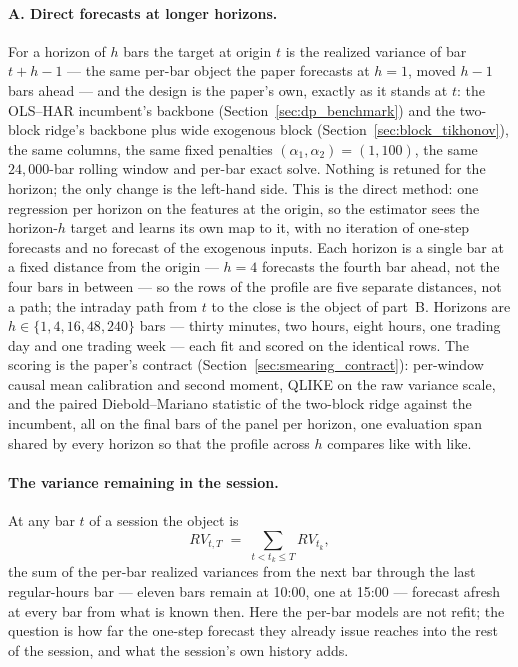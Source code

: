 \paragraph{A. Direct forecasts at longer horizons.} For a horizon of
$h$ bars the target at origin $t$ is the realized variance of bar
$t+h-1$ --- the same per-bar object the paper forecasts at $h = 1$,
moved $h-1$ bars ahead --- and the design is the paper's own, exactly
as it stands at $t$: the OLS--HAR incumbent's backbone
(Section~\ref{sec:dp_benchmark}) and the two-block ridge's backbone plus
wide exogenous block (Section~\ref{sec:block_tikhonov}), the same
columns, the same fixed penalties $(\alpha_1, \alpha_2) = (1, 100)$,
the same $24{,}000$-bar rolling window and per-bar exact solve. Nothing
is retuned for the horizon; the only change is the left-hand side.
This is the direct method: one regression per horizon on the features
at the origin, so the estimator sees the horizon-$h$ target and learns
its own map to it, with no iteration of one-step forecasts and no
forecast of the exogenous inputs. Each horizon is a single bar at a
fixed distance from the origin --- $h = 4$ forecasts the fourth bar
ahead, not the four bars in between --- so the rows of the profile are
five separate distances, not a path; the intraday path from $t$ to the
close is the object of part~B. Horizons are $h \in \{1, 4, 16, 48,
240\}$ bars --- thirty minutes, two hours, eight hours, one trading day
and one trading week --- each fit and scored on the identical rows. The
scoring is the paper's contract (Section~\ref{sec:smearing_contract}):
per-window causal mean calibration and second moment, QLIKE on the raw
variance scale, and the paired Diebold--Mariano statistic of the
two-block ridge against the incumbent, all on the final \mhpNBars{}
bars of the panel per horizon, one evaluation span shared by every
horizon so that the profile across $h$ compares like with like.

\fi

\paragraph{The variance remaining in the session.} At any bar $t$ of
a session the object is
\begin{equation}
    RV_{t,T} \;=\; \sum_{t < t_k \le T} RV_{t_k},
    \label{eq:mh_target}
\end{equation}
the sum of the per-bar realized variances from the next bar through the
last regular-hours bar --- eleven bars remain at 10:00, one at 15:00
--- forecast afresh at every bar from what is known then. Here the
per-bar models are not refit; the question is how far the one-step
forecast they already issue reaches into the rest of the session, and
what the session's own history adds.

